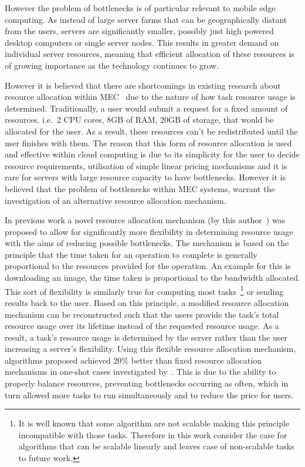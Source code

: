 However the problem of bottlenecks is of particular relevant to mobile edge computing. As instead of large server
farms that can be geographically distant from the users, servers are significantly smaller, possibly
just high powered desktop computers or single server nodes. This results in greater demand on individual server
resources, meaning that efficient allocation of these resources is of growing importance as the technology continues to
grow.

However it is believed that there are shortcomings in existing research about resource allocation within
MEC~\citep{vaji_infocom, Bi2019} due to the nature of how task resource usage is determined. Traditionally,
a user would submit a request for a fixed amount of resources, i.e.\ 2 CPU cores, 8GB of RAM, 20GB of storage, that
would be allocated for the user. As a result, these resources can't be redistributed until the user finishes with them.
The reason that this form of resource allocation is used and effective within cloud computing is due to its simplicity
for the user to decide resource requirements, utilisation of simple linear pricing mechanisms and it is rare for servers
with large resource capacity to have bottlenecks. However it is believed that the problem of bottlenecks within MEC systems,
warrant the investigation of an alternative resource allocation mechanism.

In previous work a novel resource allocation mechanism (by this author~\citep{FlexibleResourceAllocation}) was
proposed to allow for significantly more flexibility in determining resource usage with the aims of reducing possible
bottlenecks. The mechanism is based on the principle that the time taken for an operation to complete is generally
proportional to the resources provided for the operation. An example for this is downloading an image, the time taken
is proportional to the bandwidth allocated. This sort of flexibility is similarly true for computing most
tasks~\footnote{It is well known that some algorithm are not scalable making this principle incompatible with those
tasks. Therefore in this work consider the case for algorithms that can be scalable linearly and leaves case of
non-scalable tasks to future work.}
or sending results back to the user. Based on this principle, a modified resource allocation mechanism can be
reconstructed such that the users provide the task's total resource usage over its lifetime instead of the requested
resource usage. As a result, a task's resource usage is determined by the server rather than the user increasing a
server's flexibility. Using this flexible resource allocation mechanism, algorithms proposed achieved 20\%
better than fixed resource allocation mechanisms in one-shot cases investigated by~\cite{FlexibleResourceAllocation}.
This is due to the ability to properly balance resources, preventing bottlenecks occurring as often, which in turn allowed
more tasks to run simultaneously and to reduce the price for users.

